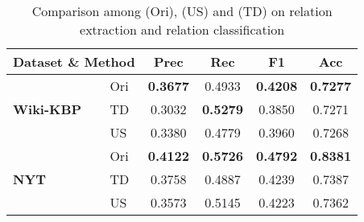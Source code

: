 \begin{table}[t]
\centering
\begin{small}
\begin{tabular}{l|l|c|c|c|c}
\hline
\multicolumn{2}{c|}{\textbf{\scriptsize Dataset \& Method}} &\textbf{Prec} &\textbf{Rec} & \textbf{F1} & \textbf{Acc} \\
\hline
\hline
\multirow{3}{*}{\textbf{\scriptsize Wiki-KBP}} 
& Ori & \textbf{0.3677} & 0.4933 & \textbf{0.4208} & \textbf{0.7277} \\
\cline{2-6}
& TD & 0.3032 & \textbf{0.5279} & 0.3850 & 0.7271\\
\cline{2-6}
& US & 0.3380 & 0.4779 & 0.3960 & 0.7268\\
\hline
\multirow{3}{*}{\textbf{\scriptsize NYT}} & Ori & \textbf{0.4122} & \textbf{0.5726} & \textbf{0.4792} & \textbf{0.8381} \\
\cline{2-6}
& TD & 0.3758 & 0.4887 & 0.4239 & 0.7387 \\
\cline{2-6}
& US & 0.3573 & 0.5145 & 0.4223 & 0.7362\\
\hline
\end{tabular}
\end{small}
\caption{\small Comparison among \our (Ori), \ourus(US) and \ourtd (TD) on relation extraction and relation classification}
\label{tab:context-awareTD}
\end{table}





